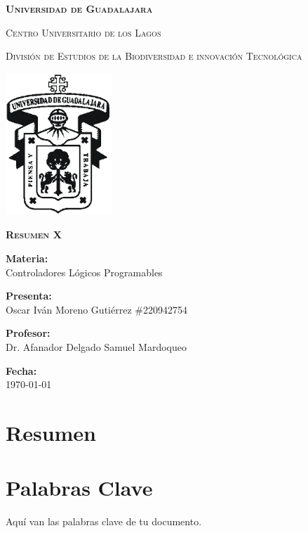\documentclass[12pt]{report}
\begin{document}
\setlength{\hoffset}{27 pt} %
\begin{titlepage}
{\centering
{\scshape\bfseries\fontsize{29.16}{34.992}\selectfont Universidad de Guadalajara \par}
\vspace{0.5cm}
{\scshape\Large Centro Universitario de los Lagos \par}
\vspace{1cm}
{\scshape\Large División de Estudios de la Biodiversidad e innovación Tecnológica \par}
\vspace{1cm}
{\graphicspath{{imagenes/Portada}} %
\includegraphics[width=0.3\textwidth]{image.png}\par}
\vspace{1cm}
{\scshape\large\bfseries Resumen X\par}
\vspace{1.5cm}
{\large \textbf{Materia:} \\Controladores Lógicos Programables\par}
\vfill
{\large \textbf{Presenta:} \\Oscar Iván Moreno Gutiérrez \#220942754\par}
\vfill
{\large \textbf{Profesor:} \\Dr. Afanador Delgado Samuel Mardoqueo \par}
\vfill
\vfill
\begin{flushright}
  {\normalsize \textbf {Fecha:} \\ \today}
\end{flushright}
\vfill}
{\large  \par}
\end{titlepage}

\chapter{Resumen}

\newpage


\chapter*{Palabras Clave}

Aquí van las palabras clave de tu documento.
\newpage
\end{document}
